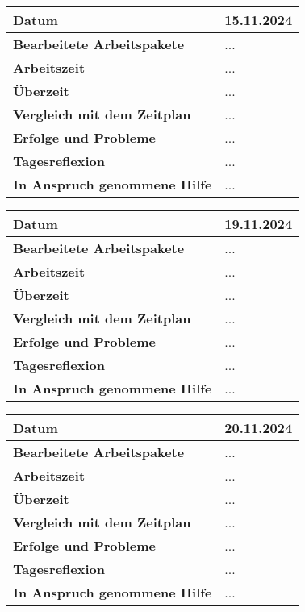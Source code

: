 \begin{longtable}{p{}|p{}}
	\hline
	\textbf{Datum}                       & 15.11.2024            \\
	\hline
	\textbf{Bearbeitete Arbeitspakete}   & ...                  \\
	\hline
	\textbf{Arbeitszeit}                 & ...                                    \\
	\hline
	\textbf{Überzeit}                    & ...                                    \\
	\hline
	\textbf{Vergleich mit dem Zeitplan}  & ... \\
	\hline
	\textbf{Erfolge und Probleme} & ...
	\\
	\hline
	\textbf{Tagesreflexion} & ...
	\\
	\hline
	\textbf{In Anspruch genommene Hilfe} & ...                              \\
	\hline
\end{longtable}\label{tab:arbeitsprotokoll-15.11.2024}
\newpage

\begin{longtable}{p{}|p{}}
	\hline
	\textbf{Datum}                       & 19.11.2024            \\
	\hline
	\textbf{Bearbeitete Arbeitspakete}   & ...                  \\
	\hline
	\textbf{Arbeitszeit}                 & ...                                    \\
	\hline
	\textbf{Überzeit}                    & ...                                    \\
	\hline
	\textbf{Vergleich mit dem Zeitplan}  & ... \\
	\hline
	\textbf{Erfolge und Probleme} & ...
	\\
	\hline
	\textbf{Tagesreflexion} & ...
	\\
	\hline
	\textbf{In Anspruch genommene Hilfe} & ...                              \\
	\hline
\end{longtable}\label{tab:arbeitsprotokoll-19.11.2024}
\newpage

\begin{longtable}{p{}|p{}}
	\hline
	\textbf{Datum}                       & 20.11.2024            \\
	\hline
	\textbf{Bearbeitete Arbeitspakete}   & ...                  \\
	\hline
	\textbf{Arbeitszeit}                 & ...                                    \\
	\hline
	\textbf{Überzeit}                    & ...                                    \\
	\hline
	\textbf{Vergleich mit dem Zeitplan}  & ... \\
	\hline
	\textbf{Erfolge und Probleme} & ...
	\\
	\hline
	\textbf{Tagesreflexion} & ...
	\\
	\hline
	\textbf{In Anspruch genommene Hilfe} & ...                              \\
	\hline
\end{longtable}\label{tab:arbeitsprotokoll-20.11.2024}
\newpage

